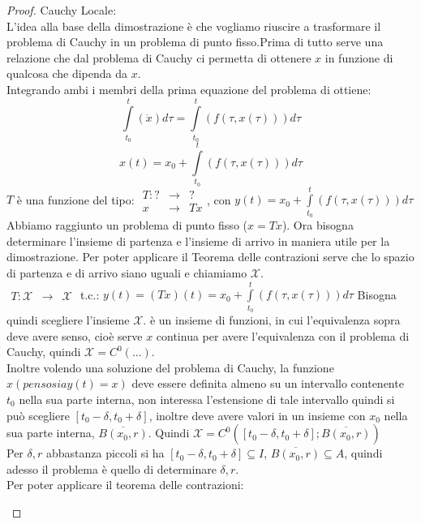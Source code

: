 \begin{proof}
	Cauchy Locale:\\
	L'idea alla base della dimostrazione è che vogliamo riuscire a trasformare il problema di Cauchy in un problema di punto fisso.Prima di tutto serve una relazione che dal problema di Cauchy ci permetta di ottenere $x$ in funzione di qualcosa che dipenda da $x$.\\
	Integrando ambi i membri della prima equazione del problema di ottiene:
	$$\int\limits_{t_0}^t(\dot{x})d\tau=\int\limits_{t_0}^t(f(\tau,x(\tau)))d\tau$$
	$$x(t)=x_0+\int\limits_{t_0}^t(f(\tau,x(\tau)))d\tau$$
	$T$ è una funzione del tipo:
	$\begin{array}{rcl} T: ? & \to & ? \\ x & \to & Tx \end{array}$, con $y(t)=x_0+\int\limits_{t_0}^t(f(\tau,x(\tau)))d\tau$\\
	Abbiamo raggiunto un problema di punto fisso ($x=Tx$). Ora bisogna determinare l'insieme di partenza e l'insieme di arrivo in maniera utile per la dimostrazione. Per poter applicare il Teorema delle contrazioni serve che lo spazio di partenza e di arrivo siano uguali e chiamiamo $\mathcal{X}$.\\
	$\begin{array}{rcl} T: \mathcal{X} & \to & \mathcal{X} \end{array}$ t.c.: $y(t)=(Tx)(t)=x_0+\int\limits_{t_0}^t(f(\tau,x(\tau)))d\tau$
	Bisogna quindi scegliere l'insieme $\mathcal{X}$. è un insieme di funzioni, in cui l'equivalenza sopra deve avere senso, cioè serve $x$ continua per avere l'equivalenza con il problema di Cauchy, quindi $\mathcal{X}=C^0(\ldots)$.\\
	Inoltre volendo una soluzione del problema di Cauchy, la funzione $x(penso sia y(t)=x)$ deve essere definita almeno su un intervallo contenente $t_0$ nella sua parte interna, non interessa l'estensione di tale intervallo quindi si può scegliere $\left[t_0-\delta,t_0+\delta\right]$, inoltre deve avere valori in un insieme con $x_0$ nella sua parte interna, $\overline{B(x_0,r)}$. Quindi $\mathcal{X}=C^0(\left[t_0-\delta,t_0+\delta\right];\overline{B(x_0,r)})$\\
	Per $\delta, r$ abbastanza piccoli si ha $\left[t_0-\delta,t_0+\delta\right]\subseteq I$, $\overline{B(x_0,r)}\subseteq A$, quindi adesso il problema è quello di determinare $\delta, r$.\\
	Per poter applicare il teorema delle contrazioni:
	\begin{description}

\end{description}
\end{proof}
